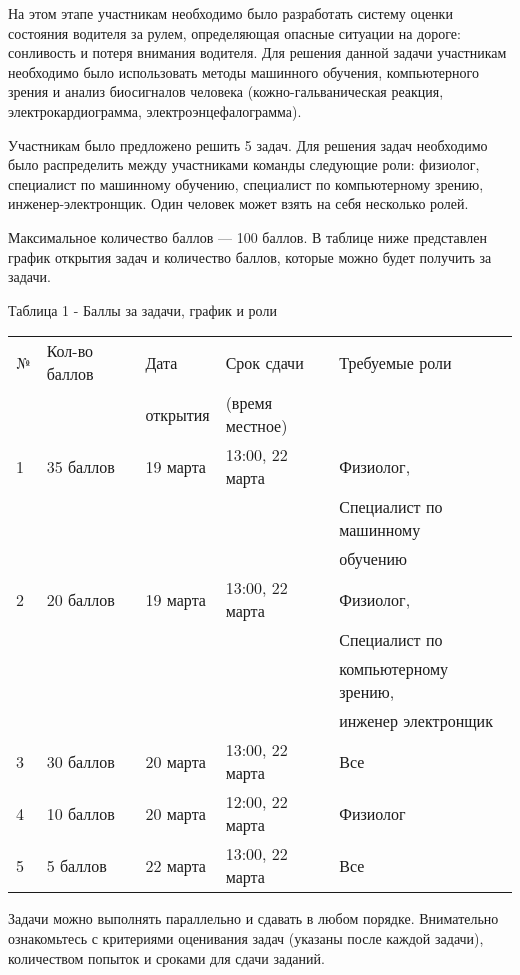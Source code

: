 На этом этапе участникам необходимо было разработать систему оценки состояния водителя за рулем, определяющая опасные ситуации на дороге: сонливость и потеря внимания водителя. Для решения данной задачи участникам необходимо было использовать методы машинного обучения, компьютерного зрения и анализ биосигналов человека (кожно-гальваническая реакция, электрокардиограмма, электроэнцефалограмма).

Участникам было предложено решить 5 задач. Для решения задач необходимо было распределить между участниками команды следующие роли: физиолог, специалист по машинному обучению, специалист по компьютерному зрению, инженер-электронщик. Один человек может взять на себя несколько ролей. 

Максимальное количество баллов — 100 баллов. В таблице ниже представлен график открытия задач и количество баллов, которые можно будет получить за задачи.

\begin{table}[H]
    Таблица 1 - Баллы за задачи, график и роли
    
    \begin{tabular}{|l|l|l|l|l|}
    \hline
    № &	Кол-во баллов & Дата & Срок сдачи & Требуемые роли \\
                    & & открытия & (время местное) &  \\            
    \hline
    1 & 35 баллов & 19 марта & 13:00, 22 марта & Физиолог, \\
                                             & & & & Специалист по машинному \\
                                             & & & & обучению \\
    2 & 20 баллов & 19 марта & 13:00, 22 марта & Физиолог, \\
                                              & & & & Специалист по \\ 
                                              & & & & компьютерному зрению, \\
                                              & & & & инженер электронщик \\
    3 & 30 баллов & 20 марта & 13:00, 22 марта & Все \\
    4 & 10 баллов & 20 марта & 12:00, 22 марта & Физиолог \\
    5 & 5 баллов & 22 марта & 13:00, 22 марта & Все \\
    \hline
    \end{tabular}
\end{table}

Задачи можно выполнять параллельно и сдавать в любом порядке. Внимательно ознакомьтесь с критериями оценивания задач (указаны после каждой задачи), количеством попыток и сроками для сдачи заданий.